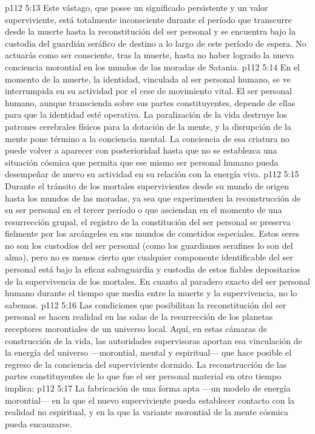 \vs p112 5:13 Este vástago, que posee un significado persistente y un valor superviviente, está totalmente inconsciente durante el período que transcurre desde la muerte hasta la reconstitución del ser personal y se encuentra bajo la custodia del guardián seráfico de destino a lo largo de este período de espera. No actuarás como ser consciente, tras la muerte, hasta no haber logrado la nueva conciencia morontial en los mundos de las moradas de Satania.
\vs p112 5:14 En el momento de la muerte, la identidad, vinculada al ser personal humano, se ve interrumpida en su actividad por el cese de movimiento vital. El ser personal humano, aunque transcienda sobre sus partes constituyentes, depende de ellas para que la identidad esté operativa. La paralización de la vida destruye los patrones cerebrales físicos para la dotación de la mente, y la disrupción de la mente pone término a la conciencia mental. La conciencia de esa criatura no puede volver a aparecer con posterioridad hasta que no se establezca una situación cósmica que permita que ese mismo ser personal humano pueda desempeñar de nuevo su actividad en su relación con la energía viva.
\vs p112 5:15 \pc Durante el tránsito de los mortales supervivientes desde su mundo de origen hasta los mundos de las moradas, ya sea que experimenten la reconstrucción de su ser personal en el tercer período o que asciendan en el momento de una resurrección grupal, el registro de la constitución del ser personal se preserva fielmente por los arcángeles en sus mundos de cometidos especiales. Estos seres no son los custodios del ser personal (como los guardianes serafines lo son del alma), pero no es menos cierto que cualquier componente identificable del ser personal está bajo la eficaz salvaguardia y custodia de estos fiables depositarios de la supervivencia de los mortales. En cuanto al paradero exacto del ser personal humano durante el tiempo que media entre la muerte y la supervivencia, no lo sabemos.
\vs p112 5:16 \pc Las condiciones que posibilitan la reconstitución del ser personal se hacen realidad en las salas de la resurrección de los planetas receptores morontiales de un universo local. Aquí, en estas cámaras de construcción de la vida, las autoridades supervisoras aportan esa vinculación de la energía del universo ---morontial, mental y espiritual--- que hace posible el regreso de la conciencia del superviviente dormido. La reconstrucción de las partes constituyentes de lo que fue el ser personal material en otro tiempo implica:
\vs p112 5:17 La fabricación de una forma apta ---un modelo de energía morontial--- en la que el nuevo superviviente pueda establecer contacto con la realidad no espiritual, y en la que la variante morontial de la mente cósmica pueda encauzarse.
